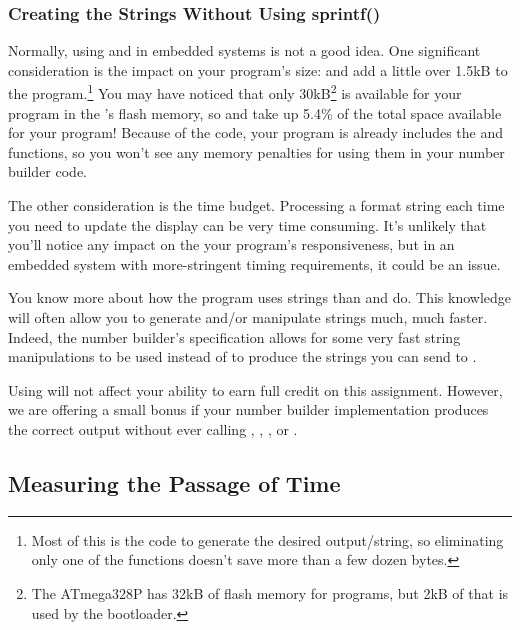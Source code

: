 \subsubsection{Creating the Strings Without Using sprintf()}

Normally, using  and  in embedded systems is not a good idea.
One significant consideration is the impact on your program's size:  and  add a little over 1.5kB to the program.\footnote{
    Most of this is the code to generate the desired output/string, so eliminating only one of the functions doesn't save more than a few dozen bytes.
}
You may have noticed that only 30kB\footnote{
    The ATmega328P has 32kB of flash memory for programs, but 2kB of that is used by the bootloader.
} is available for your program in the \developmentboard's flash memory, so  and  take up 5.4\% of the total space available for your program!
Because of the  code, your program is already includes the  and  functions, so you won't see any memory penalties for using them in your number builder code.

The other consideration is the time budget.
Processing a format string each time you need to update the display can be very time consuming.
It's unlikely that you'll notice any impact on the your program's responsiveness, but in an embedded system with more-stringent timing requirements, it could be an issue.

You know more about how the program uses strings than  and  do.
This knowledge will often allow you to generate and/or manipulate strings much, much faster.
Indeed, the number builder's specification allows for some very fast string manipulations to be used instead of  to produce the strings you can send to .

Using  will not affect your ability to earn full credit on this assignment.
However, we are offering a small bonus if your number builder implementation produces the correct output without ever calling , , , or .


\subsection{Measuring the Passage of Time}

